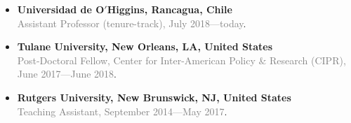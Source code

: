 \begin{itemize}
  \item[\textcolor{gray}{\textbullet}] {\bf Universidad de O$'$Higgins, Rancagua, Chile}\\
  \textcolor{gray}{Assistant Professor (tenure-track), July 2018---today}.

  \item[\textcolor{gray}{\textbullet}] {\bf Tulane University, New Orleans, LA, United States}\\
  \textcolor{gray}{Post-Doctoral Fellow, Center for Inter-American Policy \& Research (CIPR), June 2017---June 2018}.

  \item[\textcolor{gray}{\textbullet}] {\bf Rutgers University, New Brunswick, NJ, United States}\\
 \textcolor{gray}{Teaching Assistant, September 2014---May 2017}.
\end{itemize}
